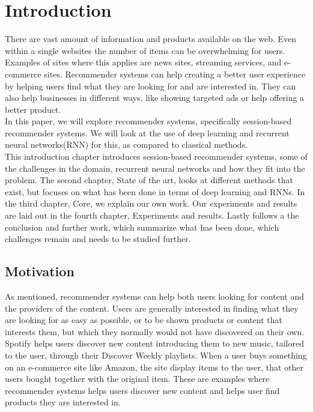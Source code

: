 \chapter{Introduction}
There are vast amount of information and products available on the web. Even within a single websites the number of items can be overwhelming for users. Examples of sites where this applies are news sites, streaming services, and e-commerce sites. Recommender systems can help creating a better user experience by helping users find what they are looking for and are interested in. They can also help businesses in different ways, like showing targeted ads or help offering a better product.\\

In this paper, we will explore recommender systems, specifically session-based recommender systems. We will look at the use of deep learning and recurrent neural networks(RNN) for this, as compared to classical methods.\\

This introduction chapter introduces session-based recommender systems, some of the challenges in the domain, recurrent neural networks and how they fit into the problem.
The second chapter, State of the art, looks at different methods that exist, but focuses on what has been done in terms of deep learning and RNNs.
In the third chapter, Core, we explain our own work.
Our experiments and results are laid out in the fourth chapter, Experiments and results.
Lastly follows a the conclusion and further work, which summarize what has been done, which challenges remain and needs to be studied further.

%


\section{Motivation}
\label{sec:motivation}

As mentioned, recommender systems can help both users looking for content and the providers of the content. Users are generally interested in finding what they are looking for as easy as possible, or to be shown products or content that interests them, but which they normally would not have discovered on their own. Spotify helps users discover new content introducing them to new music, tailored to the user, through their Discover Weekly\cite{discover-weekly} playlists. When a user buys something on an e-commerce site like Amazon, the site display items to the user, that other users bought together with the original item. These are examples where recommender systems helps users discover new content and helps user find products they are interested in.\\

